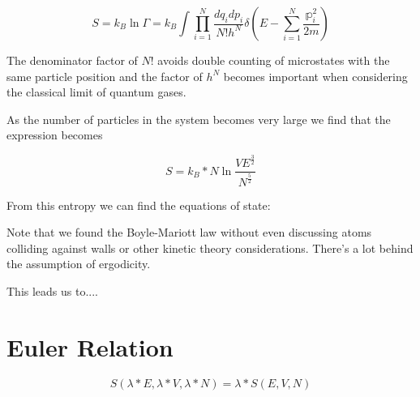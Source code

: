 \documentclass{book}
\newcommand{\thermdif}[4]{\frac{\delta#1}{\delta#2}\vert_{#3,#4}}
\newcommand{\bltz}{k_{B}}
\newcommand{\sumser}[2]{\sum\limits_{#1}^{#2}}
\begin{document}
$$S=\bltz\ln{\Gamma}=\bltz\int\prod_{i=1}^{N}\frac{dq_{i}dp_{i}}{N!h^N}\delta(E-\sumser{i=1}{N}\frac{\mathbb{p}_{i}^2}{2m})$$

The denominator factor of $N!$ avoids double counting of microstates with the same particle position and the factor of $h^{N}$ becomes important when considering the classical limit of quantum gases.

As the number of particles in the system becomes very large we find that the expression becomes

$$S=\bltz*N\ln{\frac{VE^{\frac{3}{2}}}{N^{\frac{5}{2}}}}$$

From this entropy we can find the equations of state:


Note that we found the Boyle-Mariott law without even discussing atoms colliding against walls or other kinetic theory considerations.  There's a lot behind the assumption of ergodicity.  

This leads us to....

\section{Euler Relation}

$$S(\lambda*E,\lambda*V,\lambda*N)=\lambda*S(E,V,N)$$
\end{document}
